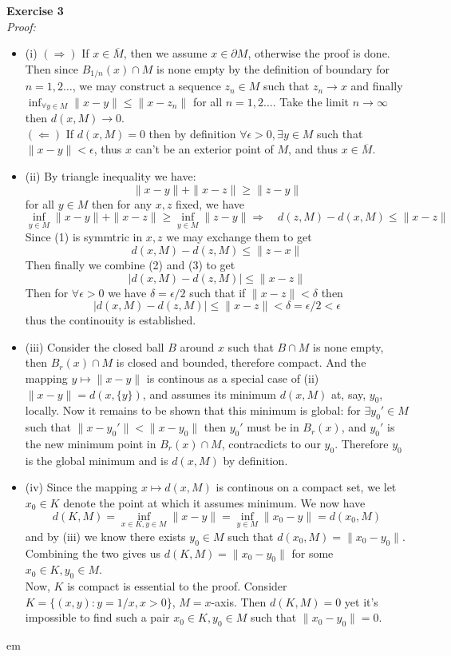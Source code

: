 \documentclass[12pt]{article}
\def\ep#1#2{{\bf Exercise #1}\\{\it Proof:}\begin{itemize}
 \setlength{\itemsep}{2pt}
 \setlength{\parskip}{0pt}
 \setlength{\parsep}{0pt}
 #2
 \end{itemize}\vskip 1 em}
\begin{document}
\ep{3}{
\item[(i)]
$(\Longrightarrow)$ If $x\in\overline{M}$, then we assume $x\in \partial M$,
otherwise the proof is done. Then since $B_{1/n}(x)\cap M$ is none empty by the definition of boundary for $n=1,2\ldots$, we may construct a sequence $z_n\in M$ such that $z_n\to x$ and finally $\inf_{\forall y\in M}\|x-y\|\leq\|x-z_n\|$ for all $n=1,2\ldots$.
Take the limit $n\to\infty$ then $d(x,M)\to0$.\\
$(\Longleftarrow)$  If $d(x,M)=0$ then by definition $\forall \epsilon>0, \exists y\in M$
 such that $\|x-y\|<\epsilon$, thus $x$ can't be an exterior point of $M$, and thus
 $x\in \overline{M}$.
 \item[(ii)]
 By triangle inequality we have:
 \begin{equation}
 \|x-y\|+\|x-z\|\ge\|z-y\|
 \end{equation}
 for all $y\in M$
 then for any $x,z$ fixed, we have
 \begin{equation}
\inf_{y\in M}\|x-y\|+\|x-z\|\ge\inf_{y\in M}\|z-y\|
\Longrightarrow\quad d(z,M)-d(x,M)\leq\|x-z\|
 \end{equation}
 Since (1) is symmtric in $x,z$ we may exchange them to get
  \begin{equation}
d(x,M)-d(z,M)\leq\|z-x\|
 \end{equation}
 Then finally we combine (2) and (3) to get
 $$
 |d(x,M)-d(z,M)|\leq\|x-z\|
 $$
 Then for $\forall \epsilon>0$ we have $\delta=\epsilon/2$ such that if $\|x-z\|<\delta$ then
 $$
  |d(x,M)-d(z,M)|\leq\|x-z\|<\delta=\epsilon/2<\epsilon
 $$
 thus the continouity is established.
 \item[(iii)]
 Consider the closed ball $B$ around $x$ such that $B\cap M$ is none empty, 
 then $B_r(x)\cap M$ is closed and bounded, therefore compact. And the mapping $y\mapsto \|x-y\|$ is continous as a special case of (ii) $\|x-y\|=d(x,\{y\})$, and assumes its minimum $d(x,M)$ at, say, $y_0$, locally. Now it remains to be shown that this minimum is global:
 for $\exists y_0'\in M$ such that $\|x-y_0'\|<\|x-y_0\|$ then $y_0'$ must be in $B_r(x)$, and $y_0'$ is the new minimum point in $B_r(x)\cap M$, contracdicts to our $y_0$.
Therefore $y_0$ is the global minimum and is $d(x,M)$ by definition.
\item[(iv)]
Since the mapping $x\mapsto d(x,M)$ is continous on a compact set, we let $x_0\in K$
 denote the point at which it assumes minimum. We now have
 $$
 d(K,M)=\inf_{x\in K,y\in M}\|x-y\|=\inf_{y\in M}\|x_0-y\|=d(x_0,M)
 $$
and by (iii) we know there exists $y_0\in M$ such that $d(x_0,M)=\|x_0-y_0\|$. Combining the two gives us $ d(K,M)=\|x_0-y_0\|$ for some $x_0\in K, y_0\in M$.\\
Now, $K$ is compact is essential to the proof. Consider $K=\{(x,y):y=1/x,x>0\}$, $M=x$-axis. Then $d(K,M)=0$ yet it's impossible to find such a pair $x_0\in K,y_0\in M$ such that $\|x_0-y_0\|=0$.
}
\end{document}
